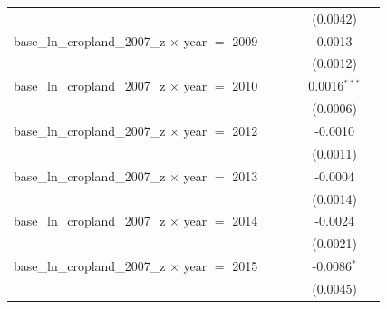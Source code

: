 \begin{tabular}{lccccc}
                                                                &                    &                 &                       & (0.0042)                   &   \\   
   base\_ln\_cropland\_2007\_z $\times$ year $=$ 2009           &                    &                 &                       & 0.0013                     &   \\   
                                                                &                    &                 &                       & (0.0012)                   &   \\   
   base\_ln\_cropland\_2007\_z $\times$ year $=$ 2010           &                    &                 &                       & 0.0016$^{***}$             &   \\   
                                                                &                    &                 &                       & (0.0006)                   &   \\   
   base\_ln\_cropland\_2007\_z $\times$ year $=$ 2012           &                    &                 &                       & -0.0010                    &   \\   
                                                                &                    &                 &                       & (0.0011)                   &   \\   
   base\_ln\_cropland\_2007\_z $\times$ year $=$ 2013           &                    &                 &                       & -0.0004                    &   \\   
                                                                &                    &                 &                       & (0.0014)                   &   \\   
   base\_ln\_cropland\_2007\_z $\times$ year $=$ 2014           &                    &                 &                       & -0.0024                    &   \\   
                                                                &                    &                 &                       & (0.0021)                   &   \\   
   base\_ln\_cropland\_2007\_z $\times$ year $=$ 2015           &                    &                 &                       & -0.0086$^{*}$              &   \\   
                                                                &                    &                 &                       & (0.0045)                   &   \\   

\end{tabular}
